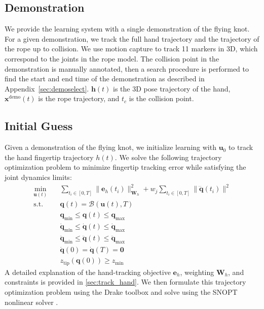 \documentclass[conference]{IEEEtran}
\newcommand{\command}{\mathbf{u}}
\newcommand{\state}{\mathbf{x}}
\newcommand{\commandt}{\mathbf{u}(t)}
\begin{document}
\subsection{Demonstration}
We provide the learning system with a single demonstration of the flying knot. For a given demonstration, we track the full hand trajectory and the trajectory of the rope up to collision. We use motion capture to track 11 markers in 3D, which correspond to the joints in the rope model. The collision point in the demonstration is manually annotated, then a search procedure is performed to find the start and end time of the demonstration as described in Appendix~\cref{sec:demoselect}. $\mathbf{h}(t)$ is the 3D pose trajectory of the hand, $\state^{\text{demo}}(t)$ is the rope trajectory, and $t_c$ is the collision point.

\subsection{Initial Guess}
\label{sec:initial_guess}
Given a demonstration of the flying knot, we initialize learning with $\command_0$ to track the hand fingertip trajectory $h(t)$. We solve the following trajectory optimization problem to minimize fingertip tracking error while satisfying the joint dynamics limits:
\begin{align}
\min_{\commandt}\quad
& \sum_{t_i\in [0,T]}\bigl\|\mathbf{e}_h(t_i)\bigr\|_{\mathbf{W}_h}^2 + w_j\sum_{t_i\in [0,T]}\bigl\|\dddot{\mathbf{q}}(t_i)\bigr\|^2
\label{eq:ik_trajopt}\\
\text{s.t.}\quad
& \mathbf{q}(t) = \mathcal{B}(\commandt, T)\nonumber\\
& \mathbf{q}_{\min}\le \mathbf{q}(t)\le \mathbf{q}_{\max} \nonumber\\
& \mathbf{\dot q}_{\min}\le \mathbf{\dot q}(t)\le \mathbf{\dot q}_{\max} \nonumber\\
& \mathbf{\ddot q}_{\min}\le \mathbf{\ddot q}(t)\le \mathbf{\ddot q}_{\max} \nonumber\\
& \dot{\mathbf{q}}(0)=\dot{\mathbf{q}}(T)=\mathbf{0} \nonumber\\
& z_{\mathrm{tip}}(\mathbf{q}(0)) \ge z_{\min} \nonumber
\end{align}
A detailed explanation of the hand-tracking objective $\mathbf{e}_h$, weighting $\mathbf{W}_h$, and constraints is provided in \cref{sec:track_hand}.
We then formulate this trajectory optimization problem using the Drake toolbox \cite{drake} and solve using the SNOPT nonlinear solver \cite{snopt}.
\end{document}
